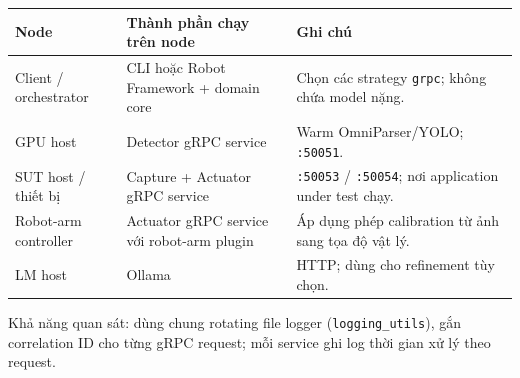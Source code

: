\documentclass[11pt,a4paper]{report}
\newcommand{\code}[1]{\texttt{#1}}
\begin{document}
\begin{longtable}{@{}p{4.2cm}p{4.2cm}p{6.0cm}@{}}
\toprule
\textbf{Node} & \textbf{Thành phần chạy trên node} & \textbf{Ghi chú} \\
\midrule
\endhead
Client / orchestrator & CLI hoặc Robot Framework + domain core & Chọn các strategy \code{grpc}; không chứa model nặng. \\
GPU host & Detector gRPC service & Warm OmniParser/YOLO; \code{:50051}. \\
SUT host / thiết bị & Capture + Actuator gRPC service & \code{:50053} / \code{:50054}; nơi application under test chạy. \\
Robot-arm controller & Actuator gRPC service với robot-arm plugin & Áp dụng phép calibration từ ảnh sang tọa độ vật lý. \\
LM host & Ollama & HTTP; dùng cho refinement tùy chọn. \\
\bottomrule
\end{longtable}

Khả năng quan sát: dùng chung rotating file logger (\code{logging\_utils}), gắn correlation
ID cho từng gRPC request; mỗi service ghi log thời gian xử lý theo request.

\end{document}
